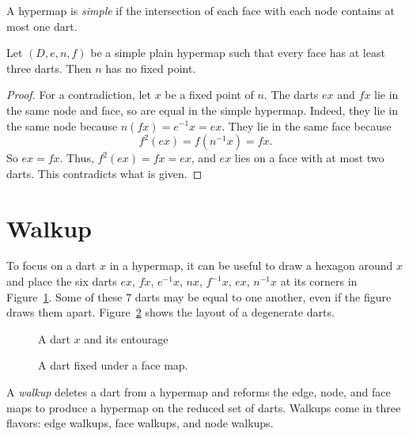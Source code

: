 \begin{definition}[simple] 
A hypermap is {\it simple} if the intersection of each face with each node contains at most one dart.
\end{definition}


\begin{lemma} 
Let $(D,e,n,f)$ be a simple plain hypermap such that every face has
at least three darts.
Then $n$ has no fixed point.
\end{lemma}

\begin{proof}  For a contradiction, let $x$ be a fixed point of $n$. The darts $e x$ and $f x$ lie in the same node and face, so are equal in the simple hypermap.  Indeed, they lie in the same node because $n(f x) = e^{-1} x = e x$. They lie in the same face because     
  $$f^2 (e x) =  f(n^{-1} x) = f x.$$
So $e x = f x$.   Thus, $f^2 (e x) = f x = e x$, and $e x$ lies on a face with at most two darts.  This contradicts what is given.
\end{proof}




\section{Walkup}

To focus on a dart $x$ in a
hypermap, it can be useful to draw a hexagon around $x$ and place
the six darts $e x$,
$f x$, $e^{-1} x$, $n x$,  $f^{-1} x$, $e x$, $n^{-1} x$  at its corners
in Figure~\ref{fig:dart+}.  Some of these $7$ darts may be
equal to one another, even if the figure draws them apart.
Figure~\ref{fig:dart-fix} shows the layout of a degenerate darts.

\begin{figure}[htb]
  \centering
  \caption{A dart $x$ and its entourage}
  \label{fig:dart+}
\end{figure}

\begin{figure}[htb]
  \centering
  \caption{A dart fixed under a face map.}
  \label{fig:dart-fix}
\end{figure}


A {\it walkup} deletes
a dart from a hypermap and reforms the edge, node, and face
maps to produce a hypermap on the reduced set of darts.  Walkups
come in three flavors: edge walkups, face walkups,
and node walkups.

